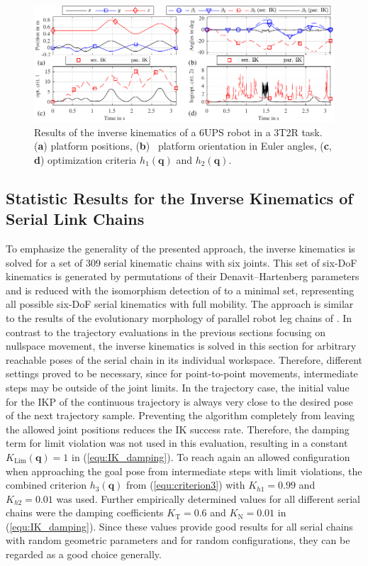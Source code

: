 \documentclass[robotics,article,accept,moreauthors,pdftex]{Definitions/mdpi}
\newcommand{\bm}[1]{\boldsymbol{#1}}
\begin{document}
%
\begin{figure}[H]
	\includegraphics{parrob_traj_results1.pdf}
	\caption{Results of the inverse kinematics of a 6UPS robot in a 3T2R task. (\textbf{a}) platform positions, (\textbf{b})~ platform orientation in Euler angles, (\textbf{c}, \textbf{d}) optimization criteria $h_1(\bm{{q}})$ and $h_2(\bm{{q}})$.}
	\label{fig:parrob_traj_3T2R}
\end{figure} 


\subsection{Statistic Results for the Inverse Kinematics of Serial Link Chains}
\label{sec:Ergebnisse_IK_Statistik}

To emphasize the generality of the presented approach, the inverse kinematics is solved for a set of 309 serial kinematic chains with six joints.
This set of six-DoF kinematics is generated by permutations of their Denavit--Hartenberg parameters and is reduced with the isomorphism detection of \cite{RamirezKotOrt2015} to a minimal set, representing all possible six-DoF serial kinematics with full mobility.
The approach is similar to the results of the evolutionary morphology of parallel robot leg chains of \cite{Gogu2008}.
In contrast to the trajectory evaluations in the previous sections focusing on nullspace movement, the inverse kinematics is solved in this section for arbitrary reachable poses of the serial chain in its individual workspace.
Therefore, different settings proved to be necessary, since for point-to-point movements, intermediate steps may be outside of the joint limits.
In the trajectory case, the initial value for the IKP of the continuous trajectory is always very close to the desired pose of the next trajectory sample.
Preventing the algorithm completely from leaving the allowed joint positions reduces the IK success rate.
Therefore, the damping term for limit violation was not used in this evaluation, resulting in a constant $K_\mathrm{Lim}(\bm{q})=1$ in (\ref{equ:IK_damping}).
To reach again an allowed configuration when approaching the goal pose from intermediate steps with limit violations, the combined criterion $h_3(\bm{q})$ from (\ref{equ:criterion3}) with $K_{h1}=0.99$ and $K_{h2}=0.01$ was used.
Further empirically determined values for all different serial chains were the damping coefficients $K_{\mathrm{T}}=0.6$ and $K_{\mathrm{N}}=0.01$ in (\ref{equ:IK_damping}).
Since these values provide good results for all serial chains with random geometric parameters and for random configurations, they can be regarded as a good choice generally.
\end{document}
